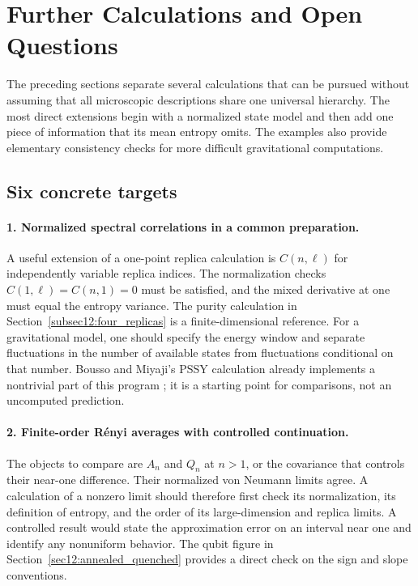 \documentclass[11pt,letterpaper]{article}
\theoremstyle{plain}
\theoremstyle{definition}
\theoremstyle{remark}
\begin{document}
\section{Further Calculations and Open Questions}
\label{sec14:research_program}

The preceding sections separate several calculations that can be pursued
without assuming that all microscopic descriptions share one universal
hierarchy. The most direct extensions begin with a normalized state
model and then add one piece of information that its mean entropy
omits. The examples also provide elementary consistency checks for
more difficult gravitational computations.

\subsection{Six concrete targets}
\label{subsec14:six_targets}

\paragraph{1. Normalized spectral correlations in a common preparation.}
A useful extension of a one-point replica calculation is
$C(n,\ell)$ for independently variable replica indices. The normalization
checks $C(1,\ell)=C(n,1)=0$ must be satisfied, and the mixed derivative
at one must equal the entropy variance. The purity calculation in
Section~\ref{subsec12:four_replicas} is a finite-dimensional reference.
For a gravitational model, one should specify the energy window and
separate fluctuations in the number of available states from
fluctuations conditional on that number. Bousso and Miyaji's PSSY
calculation already implements a nontrivial part of this program
\citep{boussomiyaji2024}; it is a starting point for comparisons, not
an uncomputed prediction.

\paragraph{2. Finite-order R\'enyi averages with controlled continuation.}
The objects to compare are $A_n$ and $Q_n$ at $n>1$, or the covariance
that controls their near-one difference. Their normalized von Neumann
limits agree. A calculation of a nonzero limit should therefore first
check its normalization, its definition of entropy, and the order of
its large-dimension and replica limits. A controlled result would state
the approximation error on an interval near one and identify any
nonuniform behavior. The qubit figure in
Section~\ref{sec12:annealed_quenched} provides a direct check on the
sign and slope conventions.
\end{document}
